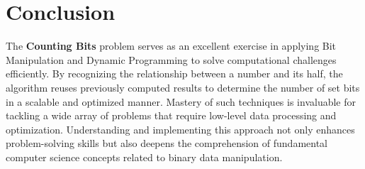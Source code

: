 \section*{Conclusion}

The \textbf{Counting Bits} problem serves as an excellent exercise in applying Bit Manipulation and Dynamic Programming to solve computational challenges efficiently. By recognizing the relationship between a number and its half, the algorithm reuses previously computed results to determine the number of set bits in a scalable and optimized manner. Mastery of such techniques is invaluable for tackling a wide array of problems that require low-level data processing and optimization. Understanding and implementing this approach not only enhances problem-solving skills but also deepens the comprehension of fundamental computer science concepts related to binary data manipulation.

\printindex

% 
% 
% 
% 
% 
% 
% 
% 